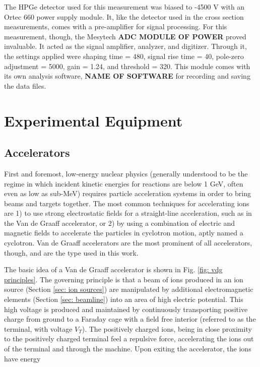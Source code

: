 The HPGe detector used for this measurement was biased to -4500 V with an Ortec 660 power supply module. It, like the detector used in the cross section measurements, comes with a pre-amplifier for signal processing. For this measurement, though, the Mesytech \textbf{ADC MODULE OF POWER} proved invaluable. It acted as the signal amplifier, analyzer, and digitizer. Through it, the settings applied were shaping time = 480, signal rise time = 40, pole-zero adjustment = 5000, gain = 1.24, and threshold = 320. This module comes with its own analysis software, \textbf{NAME OF SOFTWARE} for recording and saving the data files.



\section{Experimental Equipment}
\label{sec: equipment}



\subsection{Accelerators}
\label{sec: accelerators}

First and foremost, low-energy nuclear physics (generally understood to be the regime in which incident kinetic energies for reactions are below 1 GeV, often even as low as sub-MeV) requires particle acceleration systems in order to bring beams and targets together. The most common techniques for accelerating ions are 1) to use strong electrostatic fields for a straight-line acceleration, such as in the Van de Graaff accelerator, or 2)  by using a combination of electric and magnetic fields to accelerate the particles in cyclotron motion, aptly named a cyclotron. Van de Graaff accelerators are the most prominent of all accelerators, though, and are the type used in this work. 

The basic idea of a Van de Graaff accelerator is shown in Fig. \ref{fig: vdg principles}. The governing principle is that a beam of ions produced in an ion source (Section \ref{sec: ion sources}) are manipulated by additional electromagnetic elements (Section \ref{sec: beamline}) into an area of high electric potential. This high voltage is produced and maintained by continuously transporting positive charge from ground to a Faraday cage with a field free interior (referred to as the terminal, with voltage $V_{T}$). The positively charged ions, being in close proximity to the positively charged terminal feel a repulsive force, accelerating the ions out of the terminal and through the machine. Upon exiting the accelerator, the ions have energy

